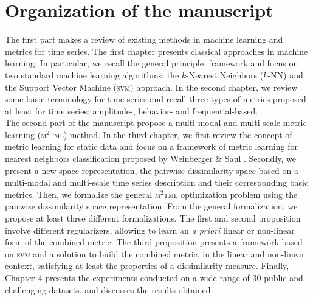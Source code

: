 
\section*{Organization of the manuscript}
\indent The first part makes a review of existing methods in machine learning and metrics for time series. The first chapter presents classical approaches in machine learning. In particular, we recall the general principle, framework and focus on two standard machine learning algorithms: the $k$-Nearest Neighbors ($k$-NN) and the Support Vector Machine (\textsc{svm}) approach. In the second chapter, we review some basic terminology for time series and recall three types of metrics proposed at least for time series: amplitude-, behavior- and frequential-based. \\
\noindent The second part of the manuscript propose a multi-modal and multi-scale metric learning (\textsc{m$^2$tml}) method. In the third chapter, we first review the concept of metric learning for static data and focus on a framework of metric learning for nearest neighbors classification proposed by Weinberger \& Saul \cite{Weinberger2009a}. Secondly, we present a new space representation, the pairwise dissimilarity space based on a multi-modal and multi-scale time series description and their corresponding basic metrics. Then, we formalize the general \textsc{m$^2$tml} optimization problem using the pairwise dissimilarity space representation. From the general formalization, we propose at least three different formalizations. The first and second proposition involve different regularizers, allowing to learn an \textit{a priori} linear or non-linear form of the combined metric. The third proposition presents a framework based on \textsc{svm} and a solution to build the combined metric, in the linear and non-linear context, satisfying at least the properties of a dissimilarity measure. Finally, Chapter 4 presents the experiments conducted on a wide range of 30 public and challenging datasets, and discusses the results obtained.

